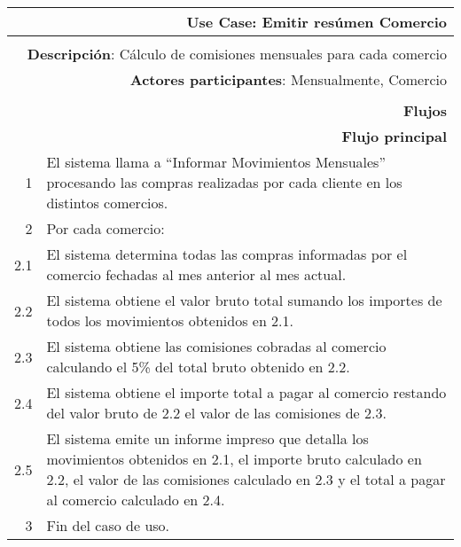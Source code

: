 \begin{tabularx}{\textwidth}{| r | X |}
\hline
\multicolumn{2}{|X|}{
\textbf{Use Case}: Emitir resúmen Comercio} \\

\hline
\multicolumn{2}{|c|}{\cellcolor[gray]{0.6}} \\

\hline
\multicolumn{2}{|X|}{
\textbf{Descripción}: Cálculo de comisiones mensuales para cada comercio} \\

\hline
\multicolumn{2}{|X|}{
\textbf{Actores participantes}: Mensualmente, Comercio} \\

\hline
\multicolumn{2}{|c|}{\cellcolor[gray]{0.6} } \\

\hline
\multicolumn{2}{|X|}{
\textbf{Flujos}} \\

\hline
\multicolumn{2}{|X|}{
\textbf{Flujo principal}} \\

\hline
1 & El sistema llama a ``Informar Movimientos Mensuales'' procesando las compras realizadas por cada cliente en los distintos
comercios. \\
\hline
2 & Por cada comercio: \\
\hline
2.1 & El sistema determina todas las compras informadas por el comercio
fechadas al mes anterior al mes actual. \\
\hline
2.2 & El sistema obtiene el valor bruto total sumando los importes de todos los
movimientos obtenidos en 2.1. \\
\hline
2.3 & El sistema obtiene las comisiones cobradas al comercio calculando el 5\%
del total bruto obtenido en 2.2. \\
\hline
2.4 & El sistema obtiene el importe total a pagar al comercio restando del
valor bruto de 2.2 el valor de las comisiones de 2.3. \\
\hline
2.5 & El sistema emite un informe impreso que detalla los movimientos obtenidos
en 2.1, el importe bruto calculado en 2.2, el valor de las comisiones calculado
en 2.3 y el total a pagar al comercio calculado en 2.4. \\
\hline
3 & Fin del caso de uso. \\

\hline
\end{tabularx}

